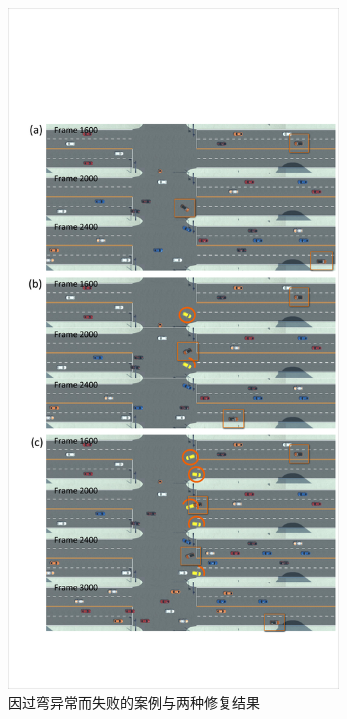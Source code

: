 \begin{figure}[!tbh]
\centering
\includegraphics[width=0.78\textwidth]{figure/keyframe/failure_cases2_v3.pdf}
\caption[因过弯异常而失败的案例与两种修复结果]{
因过弯异常而失败的案例与两种修复结果
}
\label{fig:keyframe_failure2}
\end{figure}




